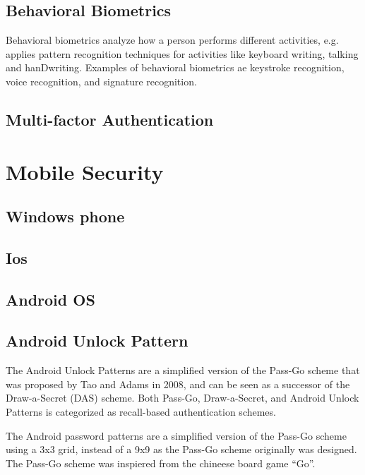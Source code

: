       \subsection*{Behavioral Biometrics}

        Behavioral biometrics analyze how a person performs different activities, e.g. applies pattern recognition techniques for activities like keyboard writing, talking and hanDwriting. Examples of behavioral biometrics ae keystroke recognition, voice recognition, and signature recognition. 

    \subsection{Multi-factor Authentication}

  \section{Mobile Security}

    \subsection{Windows phone}
    \subsection{Ios}
    \subsection{Android OS}
      
      \subsection*{Android Unlock Pattern}

      The Android Unlock Patterns are a simplified version of the Pass-Go scheme that was proposed by Tao and Adams in 2008, and can be seen as a successor of the Draw-a-Secret (DAS) scheme. Both Pass-Go, Draw-a-Secret, and Android Unlock Patterns is categorized as recall-based authentication schemes.

      The Android password patterns are a simplified version of the Pass-Go scheme using a 3x3 grid, instead of a 9x9 as the Pass-Go scheme originally was designed. The Pass-Go scheme was inspiered from the chineese board game ``Go''.


